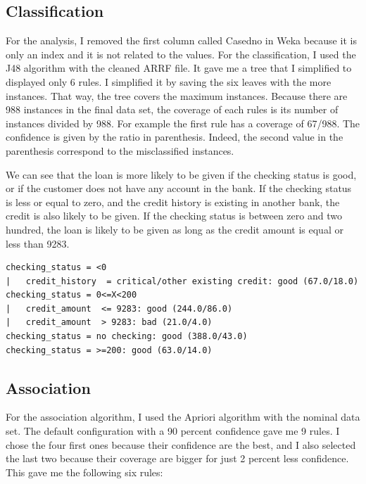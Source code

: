 \documentclass[12pt, a4paper]{article}
\begin{document}
\subsection{Classification}
For the analysis, I removed the first column called Casedno in Weka because it is only an index and it is not related to the values.
For the classification, I used the J48 algorithm with the cleaned ARRF file. It gave me a tree that I simplified to displayed only 6 rules. I simplified it by saving the six leaves with the more instances. That way, the tree covers the maximum instances. Because there are 988 instances in the final data set, the coverage of each rules is its number of instances divided by 988. For example the first rule has a coverage of 67/988. The confidence is given by the ratio in parenthesis. Indeed, the second value in the parenthesis correspond to the misclassified instances.

We can see that the loan is more likely to be given if the checking status is good, or if the customer does not have any account in the bank. If the checking status is less or equal to zero, and the credit history is existing in another bank, the credit is also likely to be given. If the checking status is between zero and two hundred, the loan is likely to be given as long as the credit amount is equal or less than 9283.

\begin{lstlisting}[caption = J48 results]
checking_status = <0
|   credit_history  = critical/other existing credit: good (67.0/18.0)
checking_status = 0<=X<200
|   credit_amount  <= 9283: good (244.0/86.0)
|   credit_amount  > 9283: bad (21.0/4.0)
checking_status = no checking: good (388.0/43.0)
checking_status = >=200: good (63.0/14.0)
\end{lstlisting}
\subsection{Association}
For the association algorithm, I used the Apriori algorithm with the nominal data set. The default configuration with a 90 percent confidence gave me 9 rules. I chose the four first ones because their confidence are the best, and I also selected the last two because their coverage are bigger for just 2 percent less confidence. This gave me the following six rules:
\end{document}
